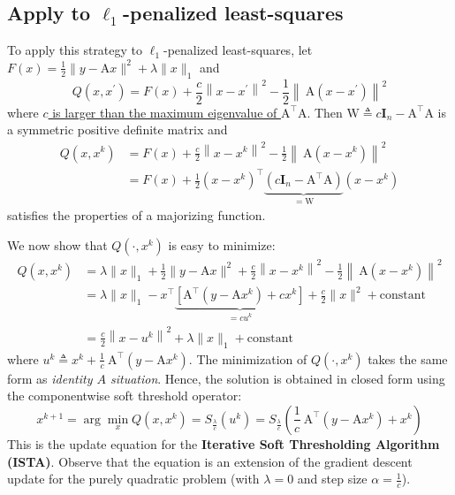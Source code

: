 \documentclass[11pt]{elegantbook}
\begin{document}
\subsection{Apply to $\ell_1$-penalized least-squares}
To apply this strategy to $\ell_1$-penalized least-squares, let $F(x)=\frac{1}{2}\|y-\mathrm{A} x\|^2+\lambda\|x\|_1$ and
$$
Q\left(x, x^{\prime}\right)=F(x)+\frac{c}{2}\left\|x-x^{\prime}\right\|^2-\frac{1}{2}\left\|\mathrm{~A}\left(x-x^{\prime}\right)\right\|^2
$$
where \underline{$c$ is larger than the maximum eigenvalue of $\mathrm{A}^{\top} \mathrm{A}$}. Then $\mathrm{W} \triangleq c \mathbf{I}_{n}-\mathrm{A}^{\top} \mathrm{A}$ is a symmetric positive definite matrix and
$$
\begin{aligned}
Q\left(x, x^k\right) &=F(x)+\frac{c}{2}\left\|x-x^k\right\|^2-\frac{1}{2}\left\|\mathrm{~A}\left(x-x^k\right)\right\|^2 \\
&=F(x)+\frac{1}{2}\left(x-x^k\right)^{\top} \underbrace{\left(c \mathbf{I}_{n}-\mathrm{A}^{\top} \mathrm{A}\right)}_{=\mathrm{W}}\left(x-x^k\right)
\end{aligned}
$$
satisfies the properties of a majorizing function.

We now show that $Q\left(\cdot, x^k\right)$ is easy to minimize:
$$
\begin{aligned}
Q\left(x, x^k\right) &=\lambda\|x\|_1+\frac{1}{2}\|y-\mathrm{A} x\|^2+\frac{c}{2}\left\|x-x^k\right\|^2-\frac{1}{2}\left\|\mathrm{~A}\left(x-x^k\right)\right\|^2 \\
&=\lambda\|x\|_1-x^{\top} \underbrace{\left[\mathrm{A}^{\top}\left(y-\mathrm{A} x^k\right)+c x^k\right]}_{=c u^k}+\frac{c}{2}\|x\|^2+\mathrm{constant} \\
&=\frac{c}{2}\left\|x-u^k\right\|^2+\lambda\|x\|_1+\mathrm{constant}
\end{aligned}
$$
where $u^k \triangleq x^k+\frac{1}{c} \mathrm{~A}^{\top}\left(y-\mathrm{A} x^k\right)$. The minimization of $Q\left(\cdot, x^k\right)$ takes the same form as \textit{identity $A$ situation}. Hence, the solution is obtained in closed form using the componentwise soft threshold operator:
$$
x^{k+1}=\arg \min _x Q\left(x, x^k\right)=S_{\frac{\lambda}{c}}\left(u^k\right)=S_{\frac{\lambda}{c}}\left(\frac{1}{c} \mathrm{~A}^{\top}\left(y-\mathrm{A} x^k\right)+x^k\right)
$$
This is the update equation for the \textbf{Iterative Soft Thresholding Algorithm (ISTA)}. Observe that the equation is an extension of the gradient descent update for the purely quadratic problem (with $\lambda=0$ and step size $\alpha=\frac{1}{c}$).
\end{document}
